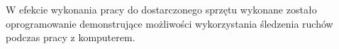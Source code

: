 \label{ch:wstep}


W efekcie wykonania pracy do dostarczonego sprzętu wykonane zostało oprogramowanie demonstrujące możliwości wykorzystania śledzenia ruchów podczas pracy z komputerem.
% 
% 
% 
% 
% 
% 
